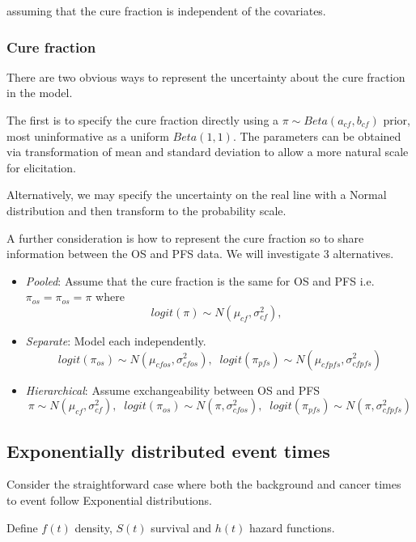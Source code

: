 \documentclass[
]{article}
\providecommand{\tightlist}{%
  \setlength{\itemsep}{0pt}\setlength{\parskip}{0pt}}
\begin{document}
assuming that the cure fraction is independent of the covariates.

\hypertarget{cure-fraction}{%
\subsubsection{Cure fraction}\label{cure-fraction}}

There are two obvious ways to represent the uncertainty about the cure
fraction in the model.

The first is to specify the cure fraction directly using a
\(\pi \sim Beta(a_{cf}, b_{cf})\) prior, most uninformative as a uniform
\(Beta(1,1)\). The parameters can be obtained via transformation of mean
and standard deviation to allow a more natural scale for elicitation.

Alternatively, we may specify the uncertainty on the real line with a
Normal distribution and then transform to the probability scale.

A further consideration is how to represent the cure fraction so to
share information between the OS and PFS data. We will investigate 3
alternatives.

\begin{itemize}
\tightlist
\item
  \emph{Pooled}: Assume that the cure fraction is the same for OS and
  PFS i.e.~\(\pi_{os} = \pi_{os} = \pi\) where \[
  logit(\pi) \sim N(\mu_{cf}, \sigma_{cf}^2), \;\;
  \]
\item
  \emph{Separate}: Model each independently. \[
  logit(\pi_{os}) \sim N(\mu_{cfos}, \sigma_{cfos}^2), \;\;  
  logit(\pi_{pfs}) \sim N(\mu_{cfpfs}, \sigma_{cfpfs}^2)  
  \]
\item
  \emph{Hierarchical}: Assume exchangeability between OS and PFS\[
  \pi \sim N(\mu_{cf}, \sigma_{cf}^2), \;\;  
  logit(\pi_{os}) \sim N(\pi, \sigma_{cfos}^2), \;\;  
  logit(\pi_{pfs}) \sim N(\pi, \sigma_{cfpfs}^2)  
  \]
\end{itemize}

\hypertarget{exponentially-distributed-event-times}{%
\subsection{Exponentially distributed event
times}\label{exponentially-distributed-event-times}}

Consider the straightforward case where both the background and cancer
times to event follow Exponential distributions.

Define \(f(t)\) density, \(S(t)\) survival and \(h(t)\) hazard
functions.
\end{document}
